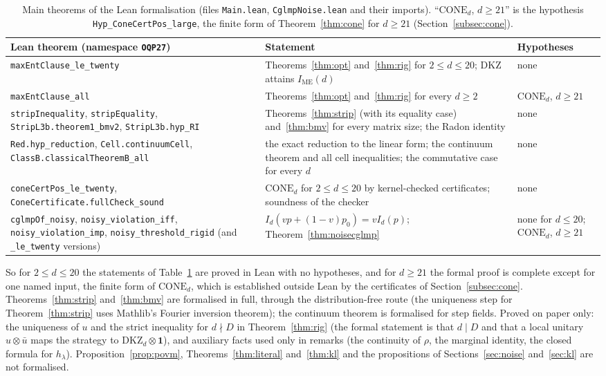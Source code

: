 \documentclass[11pt]{article}
\theoremstyle{remark}
\numberwithin{equation}{section}
\newcommand{\IME}{I_{\mathrm{ME}}}
\newcommand{\one}{\mathbf{1}}
\newcommand{\DKZ}{\mathrm{DKZ}}
\newcommand{\CONE}{\mathrm{CONE}}
\begin{document}
\begin{table}[t]
\centering\footnotesize
\caption{Main theorems of the Lean formalisation (files \texttt{Main.lean}, \texttt{CglmpNoise.lean} and their imports).
``$\CONE_d$, $d\ge21$'' is the hypothesis \texttt{Hyp\_ConeCertPos\_large}, the finite form of Theorem~\ref{thm:cone}
for $d\ge21$ (Section~\ref{subsec:cone}).}\label{tab:lean}
\begin{tabular}{@{}>{\raggedright\arraybackslash}p{}>{\raggedright\arraybackslash}p{}>{\raggedright\arraybackslash}p{}@{}}
\toprule
Lean theorem (namespace \texttt{OQP27}) & Statement & Hypotheses\\
\midrule
\nolinkurl{maxEntClause_le_twenty} & Theorems~\ref{thm:opt} and~\ref{thm:rig} for $2\le d\le20$; DKZ attains $\IME(d)$ &
none\\
\nolinkurl{maxEntClause_all} & Theorems~\ref{thm:opt} and~\ref{thm:rig} for every $d\ge2$ & $\CONE_d$, $d\ge21$\\
\nolinkurl{stripInequality}, \nolinkurl{stripEquality}, \nolinkurl{StripL3b.theorem1_bmv2}, \nolinkurl{StripL3b.hyp_RI} &
Theorems~\ref{thm:strip} (with its equality case) and~\ref{thm:bmv} for every matrix size; the Radon identity & none\\
\nolinkurl{Red.hyp_reduction}, \nolinkurl{Cell.continuumCell}, \nolinkurl{ClassB.classicalTheoremB_all} & the exact
reduction to the linear form; the continuum theorem and all cell inequalities; the commutative case for every $d$ &
none\\
\nolinkurl{coneCertPos_le_twenty}, \nolinkurl{ConeCertificate.fullCheck_sound} & $\CONE_d$ for $2\le d\le20$ by
kernel-checked certificates; soundness of the checker & none\\
\nolinkurl{cglmpOf_noisy}, \nolinkurl{noisy_violation_iff}, \nolinkurl{noisy_violation_imp},
\nolinkurl{noisy_threshold_rigid} (and \nolinkurl{_le_twenty} versions) & $I_d(vp+(1-v)p_0)=vI_d(p)$;
Theorem~\ref{thm:noisecglmp} & none for $d\le20$; $\CONE_d$, $d\ge21$\\
\bottomrule
\end{tabular}
\end{table}

So for $2\le d\le20$ the statements of Table~\ref{tab:lean} are proved in Lean with no hypotheses, and for $d\ge21$ the
formal proof is complete except for one named input, the finite form of $\CONE_d$, which is established outside Lean by
the certificates of Section~\ref{subsec:cone}. Theorems~\ref{thm:strip} and~\ref{thm:bmv} are formalised in full,
through the distribution-free route (the uniqueness step for Theorem~\ref{thm:strip} uses Mathlib's Fourier inversion
theorem); the continuum theorem is formalised for step fields. Proved on paper only: the uniqueness of $u$ and the
strict inequality for $d\nmid D$ in Theorem~\ref{thm:rig} (the formal statement is that $d\mid D$ and that a local
unitary $u\otimes\bar u$ maps the strategy to $\DKZ_d\otimes\one$), and auxiliary facts used only in remarks (the
continuity of $\rho$, the marginal identity, the closed formula for $h_\lambda$). Proposition~\ref{prop:povm},
Theorems~\ref{thm:literal} and~\ref{thm:kl} and the propositions of Sections~\ref{sec:noise} and~\ref{sec:kl} are not
formalised.
\end{document}
